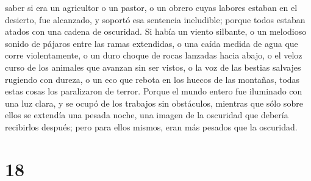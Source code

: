 saber si era un agricultor o un pastor, o un obrero cuyas labores
estaban en el desierto, fue alcanzado, y soportó esa sentencia
ineludible; porque todos estaban atados con una cadena de oscuridad.
 Si había un viento silbante, o un melodioso sonido de
pájaros entre las ramas extendidas, o una caída medida de agua que corre
violentamente,  o un duro choque de rocas lanzadas hacia
abajo, o el veloz curso de los animales que avanzan sin ser vistos, o la
voz de las bestias salvajes rugiendo con dureza, o un eco que rebota en
los huecos de las montañas, todas estas cosas los paralizaron de terror.
 Porque el mundo entero fue iluminado con una luz clara,
y se ocupó de los trabajos sin obstáculos,  mientras que
sólo sobre ellos se extendía una pesada noche, una imagen de la
oscuridad que debería recibirlos después; pero para ellos mismos, eran
más pesados que la oscuridad.

\hypertarget{section-17}{%
\section{18}\label{section-17}}

